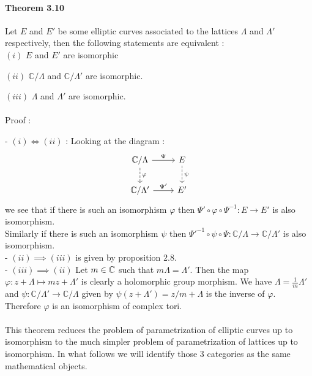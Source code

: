 \documentclass[letterpaper,10pt]{article}
\begin{document}
\paragraph{Theorem 3.10} Let $E$ and $E'$ be some elliptic curves associated to the lattices $\Lambda$ and $\Lambda'$ respectively,
then the following statements are equivalent :\\

  $(i)$ $E$ and $E'$ are isomorphic
  
  $(ii)$  $\mathbb{C}/\Lambda$ and $\mathbb{C}/\Lambda'$ are isomorphic.
  
  $(iii)$  $\Lambda$ and $\Lambda'$ are isomorphic. \\ 

{\itshape \paragraph{} Proof :} - $(i) \iff (ii)$ : Looking at the diagram : \\ \[
\begin{tikzcd}
\C/\Lambda \arrow[r, "\Psi"] \arrow[d,"\varphi",dashed] & E \arrow[d,"\psi",dashed] \\
\C/\Lambda' \arrow[r, "\Psi'"]         & E'         
\end{tikzcd}\]
we see that if there is such an isomorphism $\varphi$ then $\Psi' \circ \varphi \circ \Psi^{-1} :  E\to E'$ is also isomorphism. \\
Similarly if there is such an isomorphism $\psi$ then $ \Psi'^{-1} \circ \psi \circ \Psi : \mathbb{C} / \Lambda \to \mathbb{C} / \Lambda'$ is also isomorphism.\\
- $(ii) \implies (iii)$ is given by proposition 2.8.\\
- $(iii) \implies (ii)$ Let $m \in \mathbb{C}$ such that $m\Lambda = \Lambda'$. Then the map $\varphi : z + \Lambda \mapsto mz + \Lambda'$ is clearly a holomorphic group morphism.
We have $\Lambda = \frac{1}{m}\Lambda'$ and $\psi :  \mathbb{C} / \Lambda' \to \mathbb{C} / \Lambda$ given by $ \psi(z + \Lambda') = z/m + \Lambda $ is the inverse 
of $\varphi$. Therefore $\varphi$ is an isomorphism of complex tori.
 
{\itshape \paragraph{}This theorem reduces the problem of parametrization of elliptic curves up to isomorphism to the much simpler problem of parametrization of
 lattices up to isomorphism. In what follows we will identify those 3 categories as the same mathematical objects.
}
\end{document}
